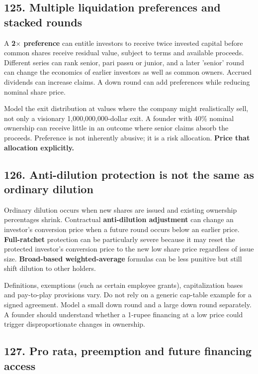 \subsection{125. Multiple liquidation preferences and stacked rounds}


A \textbf{2$\times$ preference} can entitle investors to receive twice invested capital before common shares receive residual value, subject to terms and available proceeds. Different series can rank senior, pari passu or junior, and a later 'senior' round can change the economics of earlier investors as well as common owners. Accrued dividends can increase claims. A down round can add preferences while reducing nominal share price.

Model the exit distribution at values where the company might realistically sell, not only a visionary 1,000,000,000-dollar exit. A founder with 40\% nominal ownership can receive little in an outcome where senior claims absorb the proceeds. Preference is not inherently abusive; it is a risk allocation. \textbf{Price that allocation explicitly.}

\subsection{126. Anti-dilution protection is not the same as ordinary dilution}


Ordinary dilution occurs when new shares are issued and existing ownership percentages shrink. Contractual \textbf{anti-dilution adjustment} can change an investor's conversion price when a future round occurs below an earlier price. \textbf{Full-ratchet} protection can be particularly severe because it may reset the protected investor's conversion price to the new low share price regardless of issue size. \textbf{Broad-based weighted-average} formulas can be less punitive but still shift dilution to other holders.

Definitions, exemptions (such as certain employee grants), capitalization bases and pay-to-play provisions vary. Do not rely on a generic cap-table example for a signed agreement. Model a small down round and a large down round separately. A founder should understand whether a 1-rupee financing at a low price could trigger disproportionate changes in ownership.

\subsection{127. Pro rata, preemption and future financing access}


